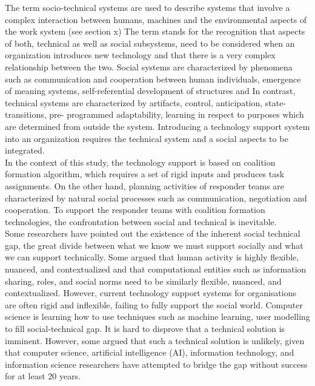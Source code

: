 The term socio-technical systems are used to describe systems that involve a complex interaction between humans, machines and the environmental aspects of the work system (see section x) The term stands for the recognition that aspects of both, technical as well as social subsystems, need to be considered when an organization introduces new technology and that there is a very complex relationship between the two. Social systems are characterized by phenomena such as communication and cooperation between human individuals, emergence of meaning systems, self-referential development of structures and In contrast, technical systems are characterized by artifacts, control, anticipation, state-transitions, pre- programmed adaptability, learning in respect to purposes which are determined from outside the system. Introducing a technology support system into an organization requires the technical system and a social aspects to be integrated.\\

In the context of this study, the technology support is based on coalition formation algorithm, which requires a set of rigid inputs and produces task assignments. On the other hand, planning activities of responder teams are characterized by natural social processes such as communication, negotiation and cooperation. To support the responder teams with coalition formation technologies, the confrontation between social and technical is inevitable. \\

Some researchers have pointed out the existence of the inherent social technical gap, the great divide between what we know we must support socially and what we can support technically.  Some argued that human activity is highly flexible, nuanced, and contextualized and that computational entities such as information sharing, roles, and social norms need to be similarly flexible, nuanced, and contextualized. However, current technology support systems for organisations are often rigid and inflexible, failing to fully support the social world. Computer science is learning how to use techniques such as machine learning, user modelling to fill social-technical gap. It is hard to disprove that a technical solution is imminent. However, some argued that such a technical solution is unlikely, given that computer science, artificial intelligence (AI), information technology, and information science researchers have attempted to bridge the gap without success for at least 20 years. \\

